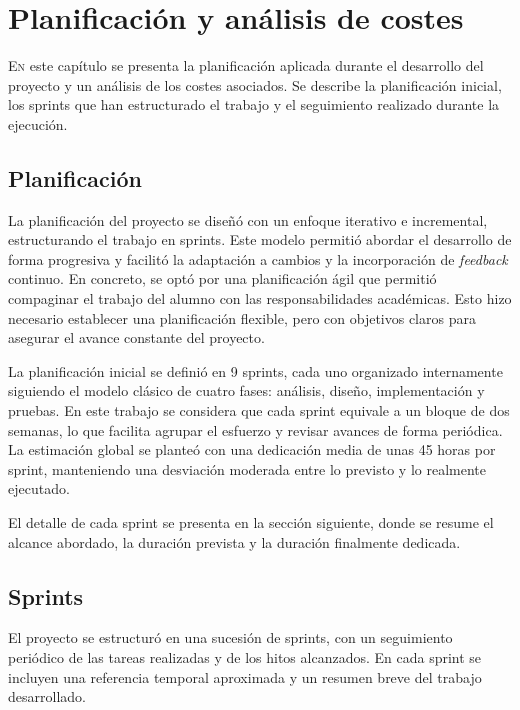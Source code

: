 \chapter{Planificación y análisis de costes}
\label{chap:planificacionycostes}

\lettrine{E}{n} este capítulo se presenta la planificación aplicada durante el desarrollo del proyecto y un análisis de los costes asociados. Se describe la planificación inicial, los sprints que han estructurado el trabajo y el seguimiento realizado durante la ejecución.

\section{Planificación}
\label{sec:planificacion}

La planificación del proyecto se diseñó con un enfoque iterativo e incremental, estructurando el trabajo en sprints. Este modelo permitió abordar el desarrollo de forma progresiva y facilitó la adaptación a cambios y la incorporación de \textit{feedback} continuo. En concreto, se optó por una planificación ágil que permitió compaginar el trabajo del alumno con las responsabilidades académicas. Esto hizo necesario establecer una planificación flexible, pero con objetivos claros para asegurar el avance constante del proyecto.

La planificación inicial se definió en 9 sprints, cada uno organizado internamente siguiendo el modelo clásico de cuatro fases: análisis, diseño, implementación y pruebas. En este trabajo se considera que cada sprint equivale a un bloque de dos semanas, lo que facilita agrupar el esfuerzo y revisar avances de forma periódica. La estimación global se planteó con una dedicación media de unas 45 horas por sprint, manteniendo una desviación moderada entre lo previsto y lo realmente ejecutado.

El detalle de cada sprint se presenta en la sección siguiente, donde se resume el alcance abordado, la duración prevista y la duración finalmente dedicada.

\section{Sprints}
\label{sec:sprints}

El proyecto se estructuró en una sucesión de sprints, con un seguimiento periódico de las tareas realizadas y de los hitos alcanzados. En cada sprint se incluyen una referencia temporal aproximada y un resumen breve del trabajo desarrollado. 

